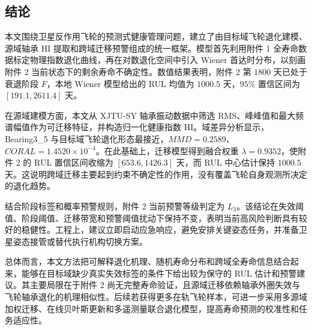 \subsection{结论}

本文围绕卫星反作用飞轮的预测式健康管理问题，建立了由目标域飞轮退化建模、源域轴承 HI 提取和跨域迁移预警组成的统一框架。模型首先利用附件 1 全寿命数据标定物理指数退化曲线，再在对数退化空间中引入 Wiener 首达时分布，以刻画附件 2 当前状态下的剩余寿命不确定性。数值结果表明，附件 2 第 $1800$ 天已处于衰退阶段 $F$，本地 Wiener 模型给出的 RUL 均值为 $1000.5$ 天，$95\%$ 置信区间为 $[191.1,2611.4]$ 天。

在源域建模方面，本文从 XJTU-SY 轴承振动数据中筛选 RMS、峰峰值和最大频谱幅值作为可迁移特征，并构造归一化健康指数 HI。域差异分析显示，Bearing3\_5 与目标域飞轮退化形态最接近，$MMD=0.2589$、$CORAL=1.4520\times10^{-4}$。在此基础上，迁移模型得到融合权重 $\lambda=0.9352$，使附件 2 的 RUL 置信区间收缩为 $[653.6,1426.3]$ 天，而 RUL 中心估计保持 $1000.5$ 天。这说明跨域迁移主要起到约束不确定性的作用，没有覆盖飞轮自身观测所决定的退化趋势。

结合阶段标签和概率预警规则，附件 2 当前预警等级判定为 $L_3$。该结论在失效阈值、阶段阈值、迁移带宽和预警阈值扰动下保持不变，表明当前高风险判断具有较好的稳健性。工程上，建议立即启动应急响应，避免安排关键姿态任务，并准备卫星姿态接管或替代执行机构切换方案。

总体而言，本文方法把可解释退化机理、随机寿命分布和跨域全寿命信息结合起来，能够在目标域缺少真实失效标签的条件下给出较为保守的 RUL 估计和预警建议。其主要局限在于附件 2 尚无完整寿命验证，且源域迁移依赖轴承外圈失效与飞轮轴承退化的机理相似性。后续若获得更多在轨飞轮样本，可进一步采用多源域加权迁移、在线贝叶斯更新和多遥测量联合退化模型，提高寿命预测的校准性和任务适应性。
